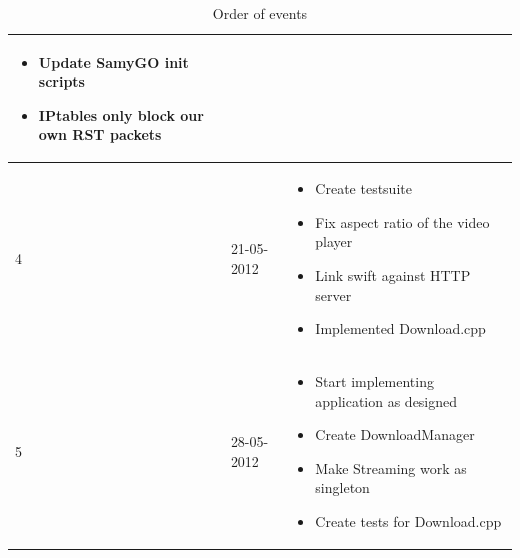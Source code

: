 \begin{table}
\begin{tabular}{| l | l | p{8 cm} |}
\begin{itemize}
								\item Update SamyGO init scripts
								\item IPtables only block our own RST packets
							\end{itemize} \\
		\hline
		4 & 21-05-2012 &		\begin{itemize}
								\item Create testsuite
								\item Fix aspect ratio of the video player
								\item Link swift against HTTP server
								\item Implemented Download.cpp
							\end{itemize} \\
		\hline
		5 & 28-05-2012 &		\begin{itemize}
								\item Start implementing application as designed
								\item Create DownloadManager
								\item Make Streaming work as singleton
								\item Create tests for Download.cpp
							\end{itemize} \\
		\hline
		
		\hline
\end{tabular}
\caption{Order of events}
\label{tab:planning}
\end{table}

